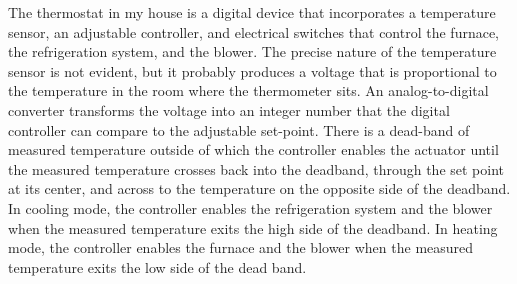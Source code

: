The thermostat in my house is a digital device that incorporates a temperature
sensor, an adjustable controller, and electrical switches that control the
furnace, the refrigeration system, and the blower. The precise nature of the
temperature sensor is not evident, but it probably produces a voltage that is
proportional to the temperature in the room where the thermometer sits. An
analog-to-digital converter transforms the voltage into an integer number that
the digital controller can compare to the adjustable set-point. There is a
dead-band of measured temperature outside of which the controller enables the
actuator until the measured temperature crosses back into the deadband, through
the set point at its center, and across to the temperature on the opposite side
of the deadband. In cooling mode, the controller enables the refrigeration
system and the blower when the measured temperature exits the high side of the
deadband. In heating mode, the controller enables the furnace and the blower
when the measured temperature exits the low side of the dead band.

